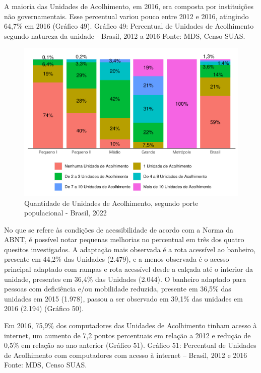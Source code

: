 \documentclass[
  brazilian]{report}
\begin{document}
A maioria das Unidades de Acolhimento, em 2016, era composta por
instituições não governamentais. Esse percentual variou pouco entre 2012
e 2016, atingindo 64,7\% em 2016 (Gráfico 49). Gráfico 49: Percentual de
Unidades de Acolhimento segundo natureza da unidade - Brasil, 2012 a
2016 Fonte: MDS, Censo SUAS.

\begin{figure}
\includegraphics{Censo-SUAS-2022_files/figure-latex/unac-porte-1} \caption[Quantidade de Unidades de Acolhimento, segundo porte populacional - Brasil, 2022]{Quantidade de Unidades de Acolhimento, segundo porte populacional - Brasil, 2022}\label{fig:unac-porte}
\end{figure}

No que se refere às condições de acessibilidade de acordo com a Norma da
ABNT, é possível notar pequenas melhorias no percentual em três dos
quatro quesitos investigados. A adaptação mais observada é a rota
acessível ao banheiro, presente em 44,2\% das Unidades (2.479), e a
menos observada é o acesso principal adaptado com rampas e rota
acessível desde a calçada até o interior da unidade, presentes em 36,4\%
das Unidades (2.044). O banheiro adaptado para pessoas com deficiência
e/ou mobilidade reduzida, presente em 36,5\% das unidades em 2015
(1.978), passou a ser observado em 39,1\% das unidades em 2016 (2.194)
(Gráfico 50).

Em 2016, 75,9\% dos computadores das Unidades de Acolhimento tinham
acesso à internet, um aumento de 7,2 pontos percentuais em relação a
2012 e redução de 0,5\% em relação ao ano anterior (Gráfico 51). Gráfico
51: Percentual de Unidades de Acolhimento com computadores com acesso à
internet -- Brasil, 2012 e 2016 Fonte: MDS, Censo SUAS.
\end{document}
